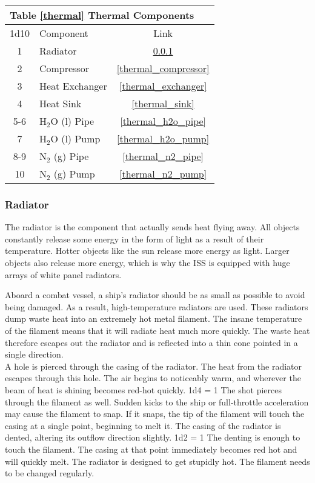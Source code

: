 \documentclass[a4paper]{article}
\begin{document}
\vspace{0.5cm} \hspace{0.25\linewidth}
\begin{tabular}{| c | l | c |}
\toprule
\multicolumn{3}{|l|}{Table \ref{thermal} Thermal Components} \\
\toprule
1d10 & Component & Link \\
\midrule
1 & Radiator & \ref{thermal_radiator} \\
2 & Compressor & \ref{thermal_compressor} \\
3 & Heat Exchanger & \ref{thermal_exchanger} \\
4 & Heat Sink & \ref{thermal_sink} \\
\midrule
5-6 & H$_2$O (l) Pipe & \ref{thermal_h2o_pipe} \\
7 & H$_2$O (l) Pump & \ref{thermal_h2o_pump} \\
8-9 & N$_2$ (g) Pipe & \ref{thermal_n2_pipe} \\
10 & N$_2$ (g) Pump & \ref{thermal_n2_pump} \\
\bottomrule
\end{tabular}

\hspace{-18pt} \subsubsection{Radiator} \label{thermal_radiator} \vspace{-0.2cm}

The radiator is the component that actually sends heat flying away. All objects constantly release some energy in the form of light as a result of their temperature. Hotter objects like the sun release more energy as light. Larger objects also release more energy, which is why the ISS is equipped with huge arrays of white panel radiators.

Aboard a combat vessel, a ship's radiator should be as small as possible to avoid being damaged. As a result, high-temperature radiators are used. These radiators dump waste heat into an extremely hot metal filament. The insane temperature of the filament means that it will radiate heat much more quickly. The waste heat therefore escapes out the radiator and is reflected into a thin cone pointed in a single direction.
\\ \pbhw
{A hole is pierced through the casing of the radiator. The heat from the radiator escapes through this hole. The air begins to noticeably warm, and wherever the beam of heat is shining becomes red-hot quickly. \newline 1d4 = 1 The shot pierces through the filament as well. Sudden kicks to the ship or full-throttle acceleration may cause the filament to snap. If it snaps, the tip of the filament will touch the casing at a single point, beginning to melt it.}
{The casing of the radiator is dented, altering its outflow direction slightly. \newline 1d2 = 1 The denting is enough to touch the filament. The casing at that point immediately becomes red hot and will quickly melt.}
{The radiator is designed to get stupidly hot.}
{The filament needs to be changed regularly.} 
\end{document}
